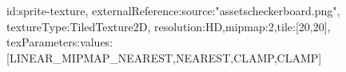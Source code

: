 {id:sprite-texture,
externalReference:{source:"assets\/checkerboard.png"},
textureType:TiledTexture2D,
resolution:HD,mipmap:2,tile:[20,20],
texParameters:{values:[LINEAR_MIPMAP_NEAREST,NEAREST,CLAMP,CLAMP]}}